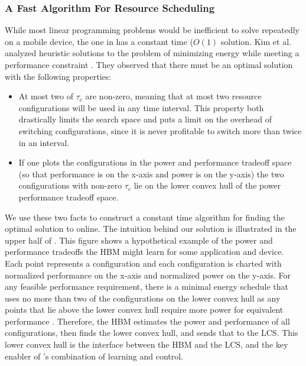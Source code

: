 \subsubsection{A Fast Algorithm For Resource Scheduling}
While most linear programming problems would be inefficient to solve
repeatedly on a mobile device, the one in  has a
constant time ($O(1)$ solution.  Kim et al. analyzed heuristic
solutions to the problem of minimizing energy while meeting a
performance constraint \cite{kim-cpsna}.  They observed that there
must be an optimal solution with the following properties:
\begin{itemize}
\item At most two of $\tau_c$ are non-zero, meaning that at most two
  resource configurations will be used in any time interval.  This
  property both drastically limits the search space and puts a limit
  on the overhead of switching configurations, since it is never
  profitable to switch more than twice in an interval.
\item If one plots the configurations in the power and performance
  tradeoff space (so that performance is on the x-axis and power is on
  the y-axis) the two configurations with non-zero $\tau_c$ lie on the
  lower convex hull of the power performance tradeoff space.
\end{itemize}
We use these two facts to construct a constant time algorithm for
finding the optimal solution to  online.  The
intuition behind our solution is illustrated in the upper half of
.  This figure shows a hypothetical example of the power
and performance tradeoffs the HBM might learn for some application and
device.  Each point represents a configuration and each configuration
is charted with normalized performance on the x-axis and normalized
power on the y-axis.  For any feasible performance requirement, there
is a minimal energy schedule that uses no more than two of the
configurations on the lower convex hull as any points that lie above
the lower convex hull require more power for equivalent performance
\cite{kim-cpsna}.  Therefore, the HBM estimates the power and
performance of all configurations, then finds the lower convex hull,
and sends that to the LCS.  This lower convex hull is the interface
between the HBM and the LCS, and the key enabler of \SYSTEM{}'s
combination of learning and control.




